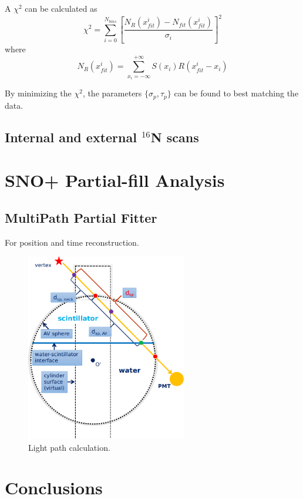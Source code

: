 \documentclass[preprint,12pt]{elsarticle}
\begin{document}
A $\chi^2$ can be calculated as
\[
  \chi^2=\sum^{N_{bins}}_{i=0}[\frac{N_R(x_{fit}^i)-N_{fit}(x_{fit}^i)}{\sigma_i}]^2
\]
where
\[N_R(x_{fit}^i)=\sum_{x_i=-\infty}^{+\infty}S(x_i)R(x_{fit}^i-x_i)\]

By minimizing the $\chi^2$, the parameters $\{\sigma_p,\tau_p\}$ can
be found to best matching the data.

\subsection{Internal and external $^{16}$N scans}






\section{SNO+ Partial-fill Analysis}


\subsection{MultiPath Partial Fitter}

For position and time reconstruction.


\begin{figure}[!htb]
	\centering
	\includegraphics[width=7cm]{scintpath.png}
	\caption{Light path calculation.}
	\label{scintpath}
\end{figure}






\section{Conclusions}
 
\end{document}
